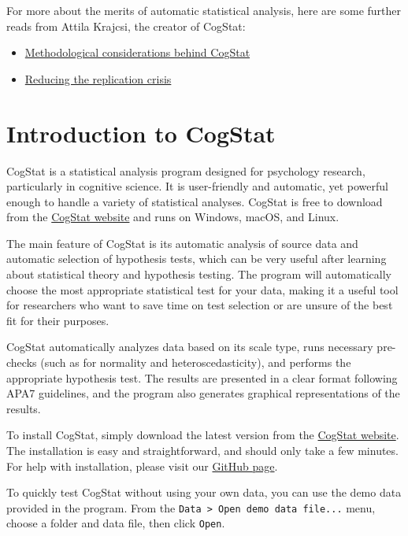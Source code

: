 \documentclass[
  11pt,
]{book}
\providecommand{\tightlist}{%
  \setlength{\itemsep}{0pt}\setlength{\parskip}{0pt}}
\theoremstyle{definition}
\theoremstyle{definition}
\theoremstyle{definition}
\theoremstyle{definition}
\theoremstyle{remark}
\begin{document}
For more about the merits of automatic statistical analysis, here are some further reads from Attila Krajcsi, the creator of CogStat:

\begin{itemize}
\tightlist
\item
  \href{https://psyarxiv.com/hnmsq}{Methodological considerations behind CogStat}
\item
  \href{https://docs.google.com/presentation/d/1HmSTPnTxDzW8hYZG7ujHaeHc0mRqqYeY95yKh56z61c}{Reducing the replication crisis}
\end{itemize}

\hypertarget{cogstatintro}{%
\chapter{Introduction to CogStat}\label{cogstatintro}}

CogStat is a statistical analysis program designed for psychology research, particularly in cognitive science. It is user-friendly and automatic, yet powerful enough to handle a variety of statistical analyses. CogStat is free to download from the \href{http://cogstat.org}{CogStat website} and runs on Windows, macOS, and Linux.

The main feature of CogStat is its automatic analysis of source data and automatic selection of hypothesis tests, which can be very useful after learning about statistical theory and hypothesis testing. The program will automatically choose the most appropriate statistical test for your data, making it a useful tool for researchers who want to save time on test selection or are unsure of the best fit for their purposes.

CogStat automatically analyzes data based on its scale type, runs necessary pre-checks (such as for normality and heteroscedasticity), and performs the appropriate hypothesis test. The results are presented in a clear format following APA7 guidelines, and the program also generates graphical representations of the results.

To install CogStat, simply download the latest version from the \href{http://cogstat.org}{CogStat website}. The installation is easy and straightforward, and should only take a few minutes. For help with installation, please visit our \href{https://github.com/cogstat/cogstat/wiki/Installation}{GitHub page}.

To quickly test CogStat without using your own data, you can use the demo data provided in the program. From the \texttt{Data\ \textgreater{}\ Open\ demo\ data\ file...} menu, choose a folder and data file, then click \texttt{Open}.
\end{document}
